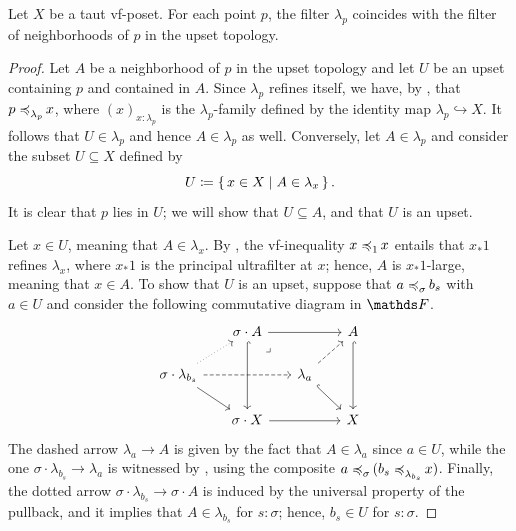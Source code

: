 \begin{prop}\label{prop:lambda_p}
    Let $X$ be a taut vf-poset. For each point $p$, the filter $\lambda_p$ coincides with the filter of neighborhoods of $p$ in the upset topology.
\end{prop}
\begin{proof}
    Let $A$ be a neighborhood of $p$ in the upset topology and let $U$ be an upset containing $p$ and contained in $A$. Since $\lambda_p$ refines itself, we have, by , that $p \mathrel{\preccurlyeq_{{\lambda_p}}^{{}}\mkern-2mu} x$, where $(x)_{x:\lambda_p}$ is the $\lambda_p$-family defined by the identity map $\lambda_p \hookrightarrow X$. It follows that $U \in \lambda_p$ and hence $A \in \lambda_p$ as well.     
    Conversely, let $A \in \lambda_p$ and consider the subset $U\subseteq X$ defined by
    \[ U \coloneqq \set{ x \in X | A \in \lambda_x}.\]
    It is clear that $p$ lies in $U$; we will show that $U\subseteq A$, and that $U$ is an upset.

    Let $x\in U$, meaning that $A\in\lambda_x$. By , the vf-inequality $x \mathrel{\preccurlyeq_{{1}}^{{}}\mkern-2mu} x$ entails that $x_*1$ refines $\lambda_x$, where $x_*1$ is the principal ultrafilter at $x$; hence, $A$ is $x_*1$-large, meaning that $x \in A$.
    To show that $U$ is an upset, suppose that $a \mathrel{\preccurlyeq_{{\sigma}}^{{}}\mkern-2mu} b_s$ with $a \in U$ and consider the following commutative diagram in $\FF$.
    \[\begin{tikzcd}[sep = 16pt]
    	& {\sigma\cdot A} && A \\
    	{\sigma\cdot\lambda_{b_s}} && {\lambda_a} \\
    	& {\sigma\cdot X} && X
    	\arrow[from=1-2, to=1-4]
    	\arrow[hook, from=1-2, to=3-2]
    	\arrow["\lrcorner"{anchor=center, pos=0.125}, draw=none, from=1-2, to=3-4]
    	\arrow[hook, from=1-4, to=3-4]
    	\arrow[dotted, from=2-1, to=1-2]
    	\arrow[dashed, from=2-1, to=2-3]
    	\arrow[from=2-1, to=3-2]
    	\arrow[dashed, from=2-3, to=1-4]
    	\arrow[hook, from=2-3, to=3-4]
    	\arrow[from=3-2, to=3-4]
    \end{tikzcd}\]
    The dashed arrow $\lambda_a \to A$ is given by the fact that $A \in \lambda_a$ since $a \in U$, while the one $\sigma \cdot \lambda_{b_s} \to \lambda_{a}$ is witnessed by , using the composite $a\mathrel{\preccurlyeq_{{\sigma}}^{{}}\mkern-2mu}(b_s\mathrel{\preccurlyeq_{{\lambda_{b_s}}}^{{}}\mkern-2mu} x)$. Finally, the dotted arrow $\sigma\cdot \lambda_{b_s} \to \sigma\cdot A$ is induced by the universal property of the pullback, and it implies that $A \in \lambda_{b_s}$ for $s : \sigma$; hence, $b_s \in U$ for $s:\sigma$.
\end{proof}

